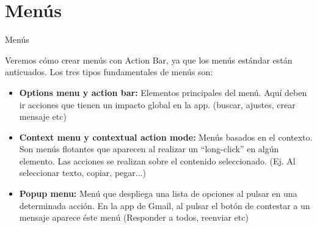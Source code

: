 \section{Menús}
\begin{frame}{Menús}
    \begin{block}{}
        Veremos cómo crear menús con Action Bar, ya que los menús estándar
        están anticuados. Los tres tipos fundamentales de menús son:
    \end{block}
    \begin{itemize}
        \item {
            \textbf{Options menu y action bar:} Elementos principales del menú.
            Aquí deben ir acciones que tienen un impacto global en la app. (buscar, ajustes, crear mensaje etc)\pause
        }
        \item {
            \textbf{Context menu y contextual action mode:} Menús basados
            en el contexto. Son menús flotantes que aparecen al realizar un “long-click”
            en algún elemento. Las acciones se realizan sobre el contenido
            seleccionado. (Ej. Al seleccionar texto, copiar, pegar...)
        }
        \item<3->{
            \textbf{Popup menu:} Menú que despliega una lista de opciones
            al pulsar en una determinada acción. En la app de Gmail, al pulsar
            el botón de contestar a un mensaje  aparece éste menú (Responder a todos, reenviar etc)
        }
    \end{itemize}
\end{frame}
